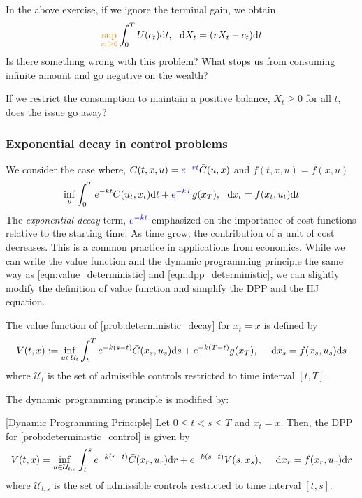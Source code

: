 \documentclass[11pt]{book}
\newcommand{\dd}{\text{\normalfont d}}
\newcommand{\dt}{\text{\normalfont d}t}
\newcommand{\ds}{\text{\normalfont d}s}
\newcommand{\dr}{\text{\normalfont d}r}
\newcommand{\dx}{\text{\normalfont d}x}
\begin{document}
\begin{ex}\label{ex:consumption_no_terminal}
    In the above exercise, if we ignore the terminal gain, we obtain 
    \[
        {\color{orange}\sup_{c_t\ge0}}\int_0^T U(c_t)\dt,~~\dd{X}_t = (rX_t - c_t)\dt
    \]
    Is there something wrong with this problem? What stops us from consuming infinite amount and go negative on the wealth?

    If we restrict the consumption to maintain a positive balance, $X_t\ge0$ for all $t$, does the issue go away?
\end{ex}
\subsubsection{Exponential decay in control problems}
We consider the case where, $C(t,x,u)={\color{blue}e^{-r t}}\bar{C}(u,x)$ and $f(t,x,u)=f(x,u)$
\begin{equation}
\label{prob:deterministic_decay}
    \inf_{u}\int_0^T e^{-k t}\bar{C}(u_t,x_t)\dt + {\color{blue}e^{-k T}}g(x_T),~~\dx_t=f(x_t,u_t)\dt
\end{equation}
The \emph{exponential decay} term, ${\color{blue}e^{-kt}}$ emphasized on the importance of cost functions relative to the starting time. As time grow, the contribution of a unit of cost decreases. This is a common practice in applications from economics. While we can write the value function and the dynamic programming principle the same way as \eqref{eqn:value_deterministic} and \eqref{eqn:dpp_deterministic}, we can slightly modify the definition of value function and simplify the DPP and the HJ equation.
\begin{defn}
The value function of \eqref{prob:deterministic_decay} for $x_t=x$ is defined by
\begin{equation}\label{eqn:value_deterministic_decay}
    V(t,x):= \inf_{u\in\mathcal{U}_{t}}\int_t^Te^{-k(s-t)}\bar{C}(x_s,u_s){{\ds}}+e^{-k(T-t)}g(x_T),~~~~{\dx}_s=f(x_s,u_s){{\ds}}
\end{equation}
where $\mathcal{U}_{t}$ is the set of admissible controls restricted to time interval $[t,T]$.
\end{defn}
The dynamic programming principle is modified by:
\begin{thm}\label{thm:dpp_deterministic_decay}
    [Dynamic Programming Principle]
    Let $0\le t<s\le T$ and $x_t=x$. Then, the DPP for \eqref{prob:deterministic_control} is given by 
    \begin{equation} \label{eqn:dpp_deterministic_decay}
    V(t,x) =\inf_{u\in\mathcal{U}_{t,s}}\int_t^s e^{-k(r-t)}\bar{C}(x_r,u_r){{\dr}}+e^{-k(s-t)}V(s,x_s),~~~~{\dx}_r=f(x_r,u_r){{\dr}}
\end{equation}
where $\mathcal{U}_{t,s}$ is the set of admissible controls restricted to time interval $[t,s]$.
\end{thm}
\end{document}
